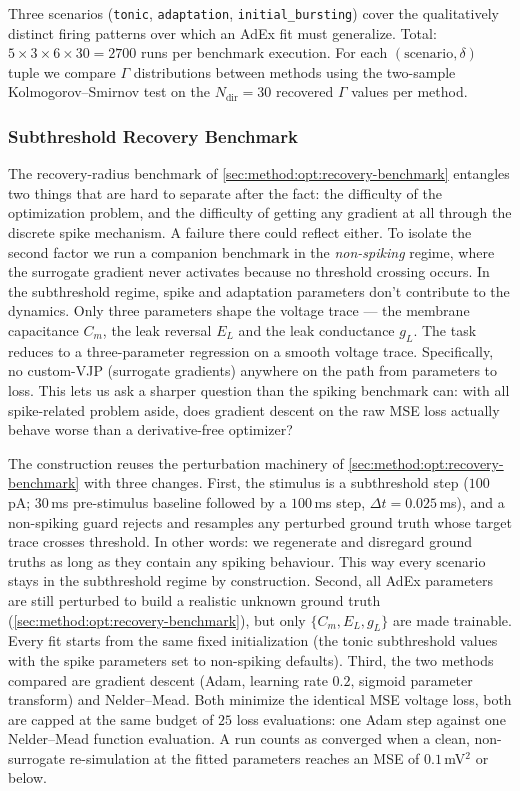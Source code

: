Three scenarios (\texttt{tonic}, \texttt{adaptation}, \texttt{initial\_bursting}) cover the qualitatively distinct firing patterns over which an \gls{AdEx} fit must generalize.
Total: $5 \times 3 \times 6 \times 30 = 2700$ runs per benchmark execution.
For each $(\text{scenario}, \delta)$ tuple we compare $\Gamma$ distributions between methods using the two-sample Kolmogorov--Smirnov test on the $N_{\text{dir}} = 30$ recovered $\Gamma$ values per method.

\subsubsection{Subthreshold Recovery Benchmark}\label{sec:method:opt:subthreshold-benchmark}
The recovery-radius benchmark of \cref{sec:method:opt:recovery-benchmark} entangles two things that are hard to separate after the fact:
the difficulty of the optimization problem, and the difficulty of getting any gradient at all through the discrete spike mechanism.
A failure there could reflect either.
To isolate the second factor we run a companion benchmark in the \emph{non-spiking} regime, where the surrogate gradient never activates because no threshold crossing occurs.
In the subthreshold regime, spike and adaptation parameters don't contribute to the dynamics.
Only three parameters shape the voltage trace --- the membrane capacitance $C_m$, the leak reversal $E_L$ and the leak conductance $g_L$.
The task reduces to a three-parameter regression on a smooth voltage trace.
Specifically, no custom-VJP (surrogate gradients) anywhere on the path from parameters to loss.
This lets us ask a sharper question than the spiking benchmark can:
with all spike-related problem aside, does gradient descent on the raw \gls{MSE} loss actually behave worse than a derivative-free optimizer?

The construction reuses the perturbation machinery of \cref{sec:method:opt:recovery-benchmark} with three changes.
First, the stimulus is a subthreshold step ($100$\,pA; $30$\,ms pre-stimulus baseline followed by a $100$\,ms step, $\Delta t = 0.025$\,ms),
and a non-spiking guard rejects and resamples any perturbed ground truth whose target trace crosses threshold.
In other words: we regenerate and disregard ground truths as long as they contain any spiking behaviour.
This way every scenario stays in the subthreshold regime by construction.
Second, all \gls{AdEx} parameters are still perturbed to build a realistic unknown ground truth (\cref{sec:method:opt:recovery-benchmark}),
but only $\{C_m, E_L, g_L\}$ are made trainable.
Every fit starts from the same fixed initialization (the tonic subthreshold values with the spike parameters set to non-spiking defaults).
Third, the two methods compared are gradient descent (Adam, learning rate $0.2$, sigmoid parameter transform) and Nelder--Mead.
Both minimize the identical \gls{MSE} voltage loss, both are capped at the same budget of $25$ loss evaluations: one Adam step against one Nelder--Mead function evaluation.
A run counts as converged when a clean, non-surrogate re-simulation at the fitted parameters reaches an \gls{MSE} of $0.1$\,mV$^2$ or below.

